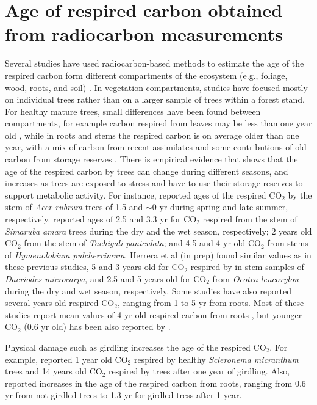 \documentclass[bg, manuscript]{copernicus}
\begin{document}
\section{Age of respired carbon obtained from radiocarbon measurements}
Several studies have used radiocarbon-based methods to estimate the age of the respired carbon form different compartments of the ecosystem (e.g., foliage, wood, roots, and soil) \citep{carbone:2007, Carbone:200713, carbone:2013, muhr:2013, Muhr:2018, Trumbore:2015}. 
In vegetation compartments, studies have focused mostly on individual trees rather than on a larger sample of trees within a forest stand. For healthy mature trees, small differences have been found between compartments, for example carbon respired from leaves may be less than one year old \citep{carbone:2007}, while in roots and stems the respired carbon is on average older than one year, with a mix of carbon from recent assimilates and some contributions of old carbon from storage reserves \citep{Muhr:2018}. There is empirical evidence that shows that the age of the respired carbon by trees can change during different seasons, and increases as trees are exposed to stress and have to use their storage reserves to support metabolic activity.  For instance, \citet{carbone:2013} reported ages of the respired CO$_2$ by the stem of \textit{Acer rubrum} trees of 1.5 and  $\sim$0 yr during spring and late summer, respectively. \citet{muhr:2013} reported ages of 2.5 and 3.3 yr for CO$_2$ respired from the stem of \textit{Simaruba amara} trees during the dry and the wet season, respectively; 2 years old CO$_2$ from the stem of \textit{Tachigali paniculata}; and 4.5 and 4 yr old CO$_2$ from stems of \textit{Hymenolobium pulcherrimum}. Herrera et al (in prep) found similar values as in these previous studies, 5 and 3 years old for CO$_2$ respired by in-stem samples of \textit{Dacriodes microcarpa}, and 2.5 and 5 years old for CO$_2$ from \textit{Ocotea leucoxylon} during the dry  and wet season, respectively. Some studies have also reported several years old respired CO$_2$, ranging from 1 to 5 yr from roots. Most of these studies report mean values of 4 yr old respired carbon from roots \citep{CZIMCZIK:2006td, Schuur:2006tm, carbone:2007}, but younger CO$_2$ (0.6 yr old) has been also reported by \citet{Hilman:2021us}. 

Physical damage such as girdling increases the age of the respired CO$_2$. For example, \citet{Muhr:2018} reported 1 year old CO$_2$ respired by healthy \textit{Scleronema micranthum} trees and 14 years old CO$_2$ respired by trees after one year of girdling. Also, \citet{Hilman:2021us} reported increases in the age of the respired carbon from roots, ranging from 0.6 yr from not girdled trees to 1.3 yr for girdled tress after 1 year.  
\end{document}
